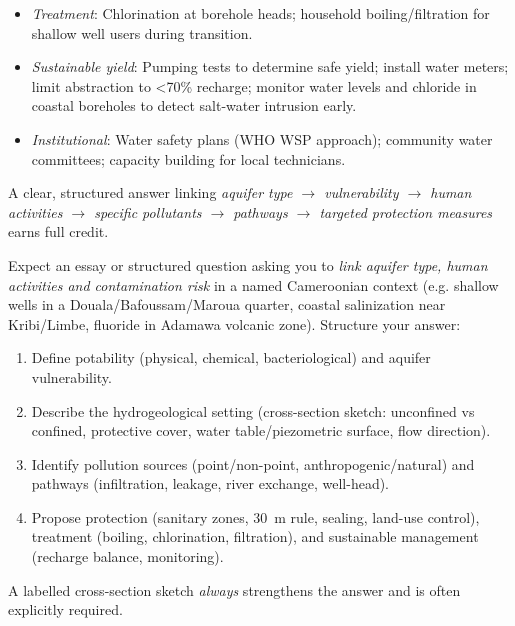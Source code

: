 \documentclass[11pt]{article}
\begin{document}
\begin{corrige}[Exercise 1]
\begin{enumerate}
\begin{itemize}
\item \emph{Treatment}: Chlorination at borehole heads; household boiling/filtration for shallow well users during transition.
\item \emph{Sustainable yield}: Pumping tests to determine safe yield; install water meters; limit abstraction to \textless 70\% recharge; monitor water levels and chloride in coastal boreholes to detect salt-water intrusion early.
\item \emph{Institutional}: Water safety plans (WHO WSP approach); community water committees; capacity building for local technicians.
\end{itemize}
\end{enumerate}
A clear, structured answer linking \emph{aquifer type $\rightarrow$ vulnerability $\rightarrow$ human activities $\rightarrow$ specific pollutants $\rightarrow$ pathways $\rightarrow$ targeted protection measures} earns full credit.
\end{corrige}

\begin{attention}
Expect an essay or structured question asking you to \emph{link aquifer type, human activities and contamination risk} in a named Cameroonian context (e.g. shallow wells in a Douala/Bafoussam/Maroua quarter, coastal salinization near Kribi/Limbe, fluoride in Adamawa volcanic zone). Structure your answer: 
\begin{enumerate}
\item Define potability (physical, chemical, bacteriological) and aquifer vulnerability.
\item Describe the hydrogeological setting (cross-section sketch: unconfined vs confined, protective cover, water table/piezometric surface, flow direction).
\item Identify pollution sources (point/non-point, anthropogenic/natural) and pathways (infiltration, leakage, river exchange, well-head).
\item Propose protection (sanitary zones, \SI{30}{m} rule, sealing, land-use control), treatment (boiling, chlorination, filtration), and sustainable management (recharge balance, monitoring).
\end{enumerate}
A labelled cross-section sketch \emph{always} strengthens the answer and is often explicitly required.
\end{attention}
\end{document}
